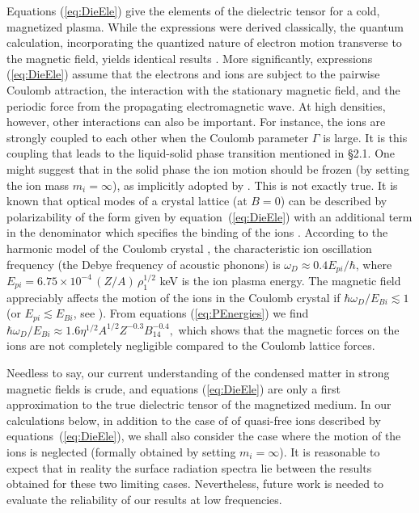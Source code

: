 \documentclass{emulateapj}
\begin{document}
Equations (\ref{eq:DieEle}) give the elements of the
dielectric tensor for a cold, magnetized plasma. While the
expressions were derived classically, the quantum
calculation, incorporating the quantized nature of
electron motion transverse to the magnetic field, yields
identical results
\citep[e.g.,][]{CanutoVentura,Pavlov-ea80}. More
significantly, expressions (\ref{eq:DieEle}) assume that
the electrons and ions are subject to the pairwise Coulomb
attraction, the interaction with the stationary magnetic
field, and the periodic force from the propagating
electromagnetic wave.  At high densities, however, other
interactions can also be important. For instance, the ions
are strongly coupled to each other when the Coulomb
parameter $\Gamma$ is large. It is this coupling that leads
to the liquid-solid phase transition mentioned in  \S2.1.
One might suggest that in the solid phase the ion motion
should be frozen (by setting the ion mass $m_i=\infty$), as
implicitly adopted by \citet{Turolla-ea}. This is not
exactly true. It is known that optical modes of a crystal
lattice (at $B=0$) can be described by polarizability of
the form given by equation~(\ref{eq:DieEle}) with an
additional term  in the denominator which specifies the
binding of the ions \citep[see, e.g.,][]{Ziman79}.
According to the harmonic model of the Coulomb crystal
\citep{Chabrier93}, the characteristic ion oscillation
frequency (the Debye frequency of acoustic phonons) is
$\omega_D \approx 0.4 E_{pi}/\hbar$, where $E_{pi}
=6.75\times 10^{-4}\,(Z/A)\,\rho_1^{1/2}$ 
keV is the ion plasma energy. 
The magnetic field appreciably affects the motion of the ions 
in the Coulomb crystal if $\hbar\omega_D/E_{Bi}\lesssim 1$ 
(or $E_{pi}\lesssim E_{Bi}$, see \citealt{Usov-ea80}).
From equations
(\ref{eq:PEnergies}) we find  $\hbar\omega_D/E_{Bi}\approx
1.6\eta^{1/2} A^{1/2} Z^{-0.3} B_{14}^{-0.4},$  which shows
that the magnetic forces on the ions are not completely
negligible compared to the Coulomb lattice forces.

Needless to say, our current understanding of the condensed
matter in strong magnetic fields is crude, and equations
(\ref{eq:DieEle}) are only a first approximation to the true
dielectric tensor of the magnetized medium. In our
calculations below, in addition to the case of of
quasi-free ions described by equations~(\ref{eq:DieEle}),
we shall also consider the 
case where the motion of
the ions is neglected (formally obtained by setting
$m_i=\infty$). It is reasonable to expect that in reality the
surface radiation spectra lie between the results obtained
for these two limiting cases.  
Nevertheless, future work is needed 
to evaluate the reliability of our results at low frequencies.
\end{document}
